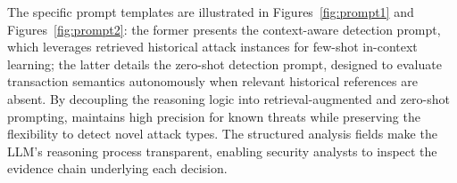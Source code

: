 The specific prompt templates are illustrated in Figures~\ref{fig:prompt1} and Figures~\ref{fig:prompt2}: the former presents the context-aware detection prompt, which leverages retrieved historical attack instances for few-shot in-context learning; the latter details the zero-shot detection prompt, designed to evaluate transaction semantics autonomously when relevant historical references are absent.
By decoupling the reasoning logic into retrieval-augmented and zero-shot prompting, \approach{} maintains high precision for known threats while preserving the flexibility to detect novel attack types. The structured analysis fields make the LLM's reasoning process transparent, enabling security analysts to inspect the evidence chain underlying each decision.

%
%



\subsection{}


